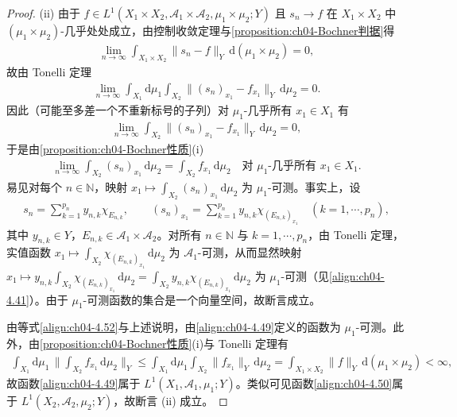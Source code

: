 \documentclass[../../main.tex]{subfiles}%
\begin{document}
\begin{proof}
(ii) 由于 $f\in L^1(X_1\times X_2,\mathcal{A}_1\times\mathcal{A}_2,\mu_1\times\mu_2;Y)$ 且 $s_n\to f$ 在 $X_1\times X_2$ 中 $(\mu_1\times\mu_2)$-几乎处处成立，由控制收敛定理与\cref{proposition:ch04-Bochner判据}得
\begin{align*}
\lim_{n\to\infty}\int_{X_1\times X_2}\|s_n-f\|_Y\,\mathrm{d}(\mu_1\times\mu_2)=0,
\end{align*}
故由 Tonelli 定理
\begin{align*}
\lim_{n\to\infty}\int_{X_1}\mathrm{d}\mu_1\int_{X_2}\|(s_n)_{x_1}-f_{x_1}\|_Y\,\mathrm{d}\mu_2=0.
\end{align*}
因此（可能至多差一个不重新标号的子列）对 $\mu_1$-几乎所有 $x_1\in X_1$ 有
\begin{align*}
\lim_{n\to\infty}\int_{X_2}\|(s_n)_{x_1}-f_{x_1}\|_Y\,\mathrm{d}\mu_2=0,
\end{align*}
于是由\cref{proposition:ch04-Bochner性质}(i)
\begin{align}
\lim_{n\to\infty}\int_{X_2}(s_n)_{x_1}\,\mathrm{d}\mu_2=\int_{X_2}f_{x_1}\,\mathrm{d}\mu_2\quad\text{对 }\mu_1\text{-几乎所有 }x_1\in X_1. \label{align:ch04-4.52}
\end{align}
易见对每个 $n\in\mathbb{N}$，映射 $x_1\mapsto\int_{X_2}(s_n)_{x_1}\,\mathrm{d}\mu_2$ 为 $\mu_1$-可测。事实上，设
\begin{align*}
s_n=\sum_{k=1}^{p_n}y_{n,k}\chi_{E_{n,k}},\qquad (s_n)_{x_1}=\sum_{k=1}^{p_n}y_{n,k}\chi_{(E_{n,k})_{x_1}}\quad(k=1,\cdots ,p_n),
\end{align*}
其中 $y_{n,k}\in Y$，$E_{n,k}\in\mathcal{A}_1\times\mathcal{A}_2$。对所有 $n\in\mathbb{N}$ 与 $k=1,\cdots ,p_n$，由 Tonelli 定理，实值函数 $x_1\mapsto\int_{X_2}\chi_{(E_{n,k})_{x_1}}\,\mathrm{d}\mu_2$ 为 $\mathcal{A}_1$-可测，从而显然映射 $x_1\mapsto y_{n,k}\int_{X_2}\chi_{(E_{n,k})_{x_1}}\,\mathrm{d}\mu_2=\int_{X_2}y_{n,k}\chi_{(E_{n,k})_{x_1}}\,\mathrm{d}\mu_2$ 为 $\mu_1$-可测（见\eqref{align:ch04-4.41}）。由于 $\mu_1$-可测函数的集合是一个向量空间，故断言成立。

由等式\eqref{align:ch04-4.52}与上述说明，由\eqref{align:ch04-4.49}定义的函数为 $\mu_1$-可测。此外，由\cref{proposition:ch04-Bochner性质}(i)与 Tonelli 定理有
\begin{align*}
\int_{X_1}\mathrm{d}\mu_1\,\Big\|\int_{X_2}f_{x_1}\,\mathrm{d}\mu_2\Big\|_Y\leqslant\int_{X_1}\mathrm{d}\mu_1\int_{X_2}\|f_{x_1}\|_Y\,\mathrm{d}\mu_2=\int_{X_1\times X_2}\|f\|_Y\,\mathrm{d}(\mu_1\times\mu_2)<\infty,
\end{align*}
故函数\eqref{align:ch04-4.49}属于 $L^1(X_1,\mathcal{A}_1,\mu_1;Y)$。类似可见函数\eqref{align:ch04-4.50}属于 $L^1(X_2,\mathcal{A}_2,\mu_2;Y)$，故断言 (ii) 成立。


\end{proof}
\end{document}
